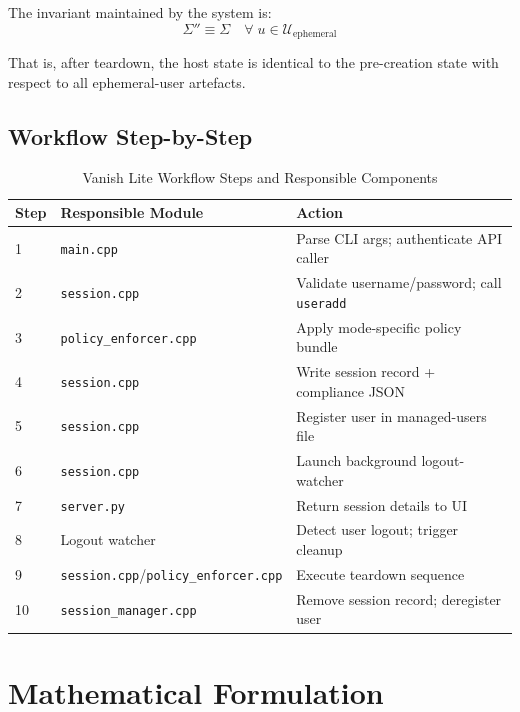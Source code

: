 The invariant maintained by the system is:
\begin{equation}
    \boxed{\Sigma'' \equiv \Sigma \quad \forall\; u \in \mathcal{U}_{\text{ephemeral}}}
    \label{eq:invariant}
\end{equation}

That is, after teardown, the host state is identical to the pre-creation state with respect to all ephemeral-user artefacts.

\subsection{Workflow Step-by-Step}

\begin{table}[H]
\centering
\caption{Vanish Lite Workflow Steps and Responsible Components}
\label{tab:workflow_steps}
\begin{tabularx}{\linewidth}{p{1cm} p{5.5cm} X}
\toprule
Step & Responsible Module & Action \\
\midrule
1 & \texttt{main.cpp} & Parse CLI args; authenticate API caller \\
2 & \texttt{session.cpp} & Validate username/password; call \texttt{useradd} \\
3 & \texttt{policy\_enforcer.cpp} & Apply mode-specific policy bundle \\
4 & \texttt{session.cpp} & Write session record + compliance JSON \\
5 & \texttt{session.cpp} & Register user in managed-users file \\
6 & \texttt{session.cpp} & Launch background logout-watcher \\
7 & \texttt{server.py} & Return session details to UI \\
8 & Logout watcher & Detect user logout; trigger cleanup \\
9 & \texttt{session.cpp}/\texttt{policy\_enforcer.cpp} & Execute teardown sequence \\
10 & \texttt{session\_manager.cpp} & Remove session record; deregister user \\
\bottomrule
\end{tabularx}
\end{table}

\section{Mathematical Formulation}
\label{sec:math_formulation}

